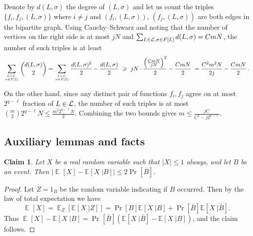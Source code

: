 \documentclass[11pt]{article}
\numberwithin{equation}{section}
\newtheorem{claim}[theorem]{Claim}
\theoremstyle{definition}
\theoremstyle{plain}
\newcommand\card[1]{\left| {#1} \right|}
\newcommand\Prob[2]{{\Pr_{#1}\left[ {#2} \right]}}
\newcommand\cExpect[3]{{\mathbb{E}_{#1}\left[ \left. #3 \;\right\vert #2 \right]}}
\newcommand\Expect[2]{{\mathop{\mathbb{E}}_{#1}\left[ {#2} \right]}}
\renewcommand\geq{\geqslant}
\renewcommand\leq{\leqslant}
\begin{document}
Denote by $d(L,\sigma)$ the degree of $(L,\sigma)$
and let us count the %
%
%
%
triples  $\{f_i,f_j, (L,\sigma)\}$
where $i\neq j$ and $(f_i, (L,\sigma))$, $(f_j, (L,\sigma))$ are
both edges in the bipartite graph. Using %
Cauchy--Schwarz %
and noting that the number of vertices on the right side is at most $j N$ and
$\sum_{L \in {\cal L}, \sigma \in F[L]}{d(L,\sigma)} = CmN$,
the number of such triples is %
at least  %
$$ \sum\limits_{L\in {\cal L}, \atop{\sigma\in F[L]}}{{d(L,\sigma) \choose 2}} = \sum\limits_{L\in {\cal L}, \atop{\sigma\in F[L]}} \frac{d(L,\sigma)^2}{2} - \frac{d(L,\sigma)}{2}
 \ \geq \ j N \cdot \frac{\left(\frac{CmN}{jN}\right)^2}{2} - \frac{CmN}{2} \  = \frac{C^2 m^2 N}{2j} - \frac{CmN}{2}\,.$$%

On the other hand, since any distinct pair of functions $f_i,f_j$ agree on at most $2^{q-\ell}$ fraction of $L \in {\cal L}$,
the number of such triples is at most $
{m \choose 2} 2^{q-\ell} N \leq \frac{ m^2 2^{q-\ell} N}{2}.  $ Combining the two bounds gives $m \leq \frac{jC}{C^2 - j 2^{q-\ell}}$.


\subsection{Auxiliary lemmas and facts}

%
%
\begin{claim}\label{claim:gen_claim}
Let $X$ be a real random variable such that $\card{X}\leq 1$ always, and let $B$ be an event.
Then $\left|\Expect{}{X}-\cExpect{}{B}{X}\right|\leq 2\Prob{}{\bar{B}}$.
\end{claim}
\begin{proof}
Let $Z = 1_B$ be the random variable indicating if $B$ occurred. Then by the law of 
total expectation we have
\[
\Expect{}{X} = \Expect{Z}{\cExpect{}{Z}{X}} = \Prob{}{B} \cExpect{}{B}{X} + \Prob{}{\bar{B}}\cExpect{}{\bar{B}}{X}.
\]
Thus $\Expect{}{X}-\cExpect{}{B}{X} = \Prob{}{\bar{B}}(\cExpect{}{\bar{B}}{X}-\cExpect{}{B}{X})$,
and the claim follows.
\end{proof}
\end{document}
